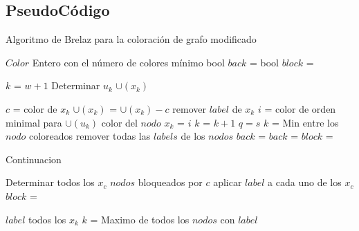 \documentclass[a4paper,10pt]{article}
\begin{document}
\subsection{PseudoCódigo}
\begin{algorithm}                      %
\caption{Algoritmo de Brelaz para la coloración de grafo modificado}          %
\label{Problema 1}                           %
\begin{algorithmic}[1]                    %
    \ENSURE $Color$ Entero con el número de colores mínimo
    \STATE bool $back$ = \FALSE
    \STATE bool $block$ = \FALSE
    
    \STATE $k$ = $w + 1$
    \WHILE \TRUE
			\STATE Determinar  $u_k$ \AND  $\cup(x_k)$
								
 			\ENDFOR
 		\ELSE
 			\STATE $c$ = color de $x_k$
 			\STATE $\cup(x_k)$ = $\cup(x_k)-{c}$
 			\STATE remover $label$ de $x_k$
		\ENDIF    	 
    		\STATE $i$ = color de orden minimal para $\cup(u_k)$
				\STATE color del $nodo$ $x_k$ = $i$
				\STATE $k$ = $k+1$
					\STATE $q = s$
					\STATE {}
    					\STATE {}
    				\ENDIF
    				\STATE $k$ = Min entre los $nodo$ coloreados
    				\STATE remover todas las $labels$ de los $nodos$
    			\ELSE
    				\STATE $back$ = \FALSE
    			\ENDIF
    		\ELSE
    			\STATE $back$ = \TRUE
    			\STATE $block$ = \TRUE    			
    		\ENDIF
    	\ENDIF
    	\ENDWHILE
\end{algorithmic}
\end{algorithm}

\begin{algorithm}			
\caption{Continuacion}  
\begin{algorithmic}
		\WHILE \TRUE
		\STATE {}
					\STATE Determinar todos los $x_c$ $nodos$ bloqueados por $c$ \AND aplicar $label$ a cada uno de los $x_c$
					\STATE $block$ = \FALSE 
				\ENDFOR
			\ENDIF
			
			\STATE $label$ todos los $x_k$
			\STATE $k$ = Maximo de todos los $nodos$ con $label$
				\STATE {}
			\ENDIF			
		\ENDIF				   		    		    	
    \ENDWHILE
\end{algorithmic}
\end{algorithm}
\end{document}
